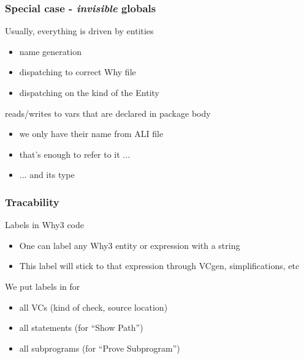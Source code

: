 \documentclass{beamer}
\newenvironment{specialframe}{%
  \begin{frame}[fragile,environment=specialframe]}{\end{frame}}
\begin{document}
\begin{specialframe}\frametitle{Special case - \emph{invisible} globals}
   \begin{block}{Usually, everything is driven by entities}
      \begin{itemize}
         \item name generation
         \item dispatching to correct Why file
         \item dispatching on the kind of the Entity
      \end{itemize}
   \end{block}
   \begin{block}{reads/writes to vars that are declared in package body}
      \begin{itemize}
         \item we only have their name from ALI file
         \item that's enough to refer to it ...
         \item ... and its type
      \end{itemize}
   \end{block}
\end{specialframe}

\begin{specialframe}\frametitle{Tracability}
   \begin{block}{Labels in Why3 code}
      \begin{itemize}
         \item One can label any Why3 entity or expression with a string
         \item This label will stick to that expression through VCgen,
         simplifications, etc
      \end{itemize}
   \end{block}
   \begin{block}{We put labels in for}
      \begin{itemize}
         \item all VCs (kind of check, source location)
         \item all statements (for ``Show Path'')
         \item all subprograms (for ``Prove Subprogram'')
      \end{itemize}
   \end{block}
\end{specialframe}
\end{document}
